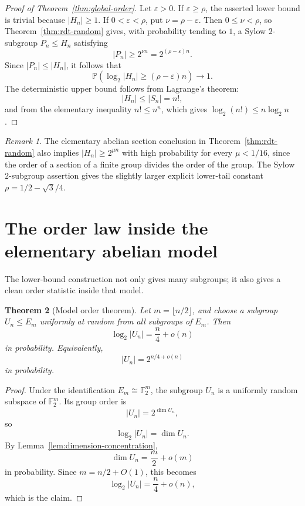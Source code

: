 \documentclass[a4paper,11pt]{amsart}
\newtheorem{theorem}{Theorem}[section]
\theoremstyle{remark}
\newtheorem{remark}[theorem]{Remark}
\newcommand{\F}{\mathbb F}
\newcommand{\Prob}{\mathbb P}
\begin{document}
\begin{proof}[Proof of Theorem~\ref{thm:global-order}]
Let \(\varepsilon>0\). If \(\varepsilon\geq\rho\), the asserted lower bound is trivial because
\(|H_n|\geq 1\). If \(0<\varepsilon<\rho\), put \(\nu=\rho-\varepsilon\). Then
\(0\leq \nu<\rho\), so Theorem~\ref{thm:rdt-random} gives, with probability tending to \(1\), a
Sylow \(2\)-subgroup \(P_n\leq H_n\) satisfying
\[
        |P_n|\geq 2^{\nu n}=2^{(\rho-\varepsilon)n}.
\]
Since \(|P_n|\leq |H_n|\), it follows that
\[
        \Prob\left(\log_2 |H_n|\geq (\rho-\varepsilon)n\right)\to 1.
\]
The deterministic upper bound follows from Lagrange's theorem:
\[
        |H_n|\leq |S_n|=n!,
\]
and from the elementary inequality \(n!\leq n^n\), which gives \(\log_2(n!)\leq n\log_2 n\).
\end{proof}

\begin{remark}
The elementary abelian section conclusion in Theorem~\ref{thm:rdt-random} also implies
\(|H_n|\geq 2^{\mu n}\) with high probability for every \(\mu<1/16\), since the order of a section
of a finite group divides the order of the group. The Sylow \(2\)-subgroup assertion gives the
slightly larger explicit lower-tail constant \(\rho=1/2-\sqrt3/4\).
\end{remark}

\section{The order law inside the elementary abelian model}\label{sec:model-order}

The lower-bound construction not only gives many subgroups; it also gives a clean order statistic
inside that model.

\begin{theorem}[Model order theorem]\label{thm:model-order}
Let \(m=\lfloor n/2\rfloor\), and choose a subgroup \(U_n\leq E_m\) uniformly at random from all
subgroups of \(E_m\). Then
\[
        \log_2 |U_n|=\frac n4+o(n)
\]
in probability. Equivalently,
\[
        |U_n|=2^{n/4+o(n)}
\]
in probability.
\end{theorem}

\begin{proof}
Under the identification \(E_m\cong \F_2^m\), the subgroup \(U_n\) is a uniformly random subspace
of \(\F_2^m\). Its group order is
\[
        |U_n|=2^{\dim U_n},
\]
so
\[
        \log_2 |U_n|=\dim U_n.
\]
By Lemma~\ref{lem:dimension-concentration},
\[
        \dim U_n=\frac m2+o(m)
\]
in probability. Since \(m=n/2+O(1)\), this becomes
\[
        \log_2 |U_n|=\frac n4+o(n),
\]
which is the claim.
\end{proof}
\end{document}
